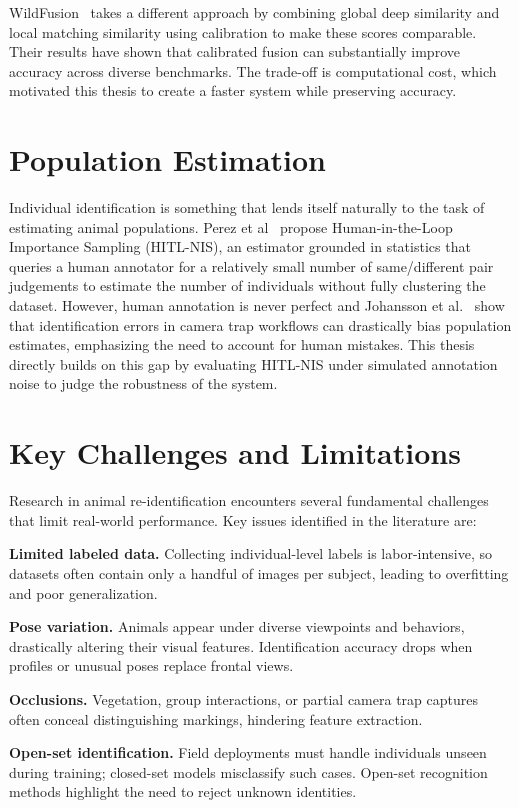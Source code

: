 WildFusion~\cite{cermak2024wildfusionindividualanimalidentification} takes a different approach by combining global deep similarity and local matching similarity using calibration to make these scores comparable. Their results have shown that calibrated fusion can substantially improve accuracy across diverse benchmarks. The trade-off is computational cost, which motivated this thesis to create a faster system while preserving accuracy. 

\section{Population Estimation}
Individual identification is something that lends itself naturally to the task of estimating animal populations. Perez et al~\cite{perez2024humanintheloopvisualreidpopulation} propose Human-in-the-Loop Importance Sampling (HITL-NIS), an estimator grounded in statistics that queries a human annotator for a relatively small number of same/different pair judgements to estimate the number of individuals without fully clustering the dataset. However, human annotation is never perfect and Johansson et al.~\cite{Johansson_Samelius_Wikberg_Chapron_Mishra_Low_2020} show that identification errors in camera trap workflows can drastically bias population estimates, emphasizing the need to account for human mistakes. This thesis directly builds on this gap by evaluating HITL-NIS under simulated annotation noise to judge the robustness of the system. 



\section{Key Challenges and Limitations}
Research in animal re-identification encounters several fundamental challenges that limit real-world performance. Key issues identified in the literature are: 

  \textbf{Limited labeled data.} Collecting individual-level labels is
   labor-intensive, so datasets often contain only a handful of images per
   subject, leading to overfitting and poor generalization.  

   \textbf{Pose variation.} Animals appear under diverse viewpoints and
   behaviors, drastically altering their visual features. Identification
   accuracy drops when profiles or unusual poses replace frontal views.  

   \textbf{Occlusions.} Vegetation, group interactions, or partial camera trap
   captures often conceal distinguishing markings, hindering feature extraction.

   \textbf{Open-set identification.} Field deployments must handle individuals
   unseen during training; closed-set models misclassify such cases. Open-set
   recognition methods highlight the need to reject unknown identities.

